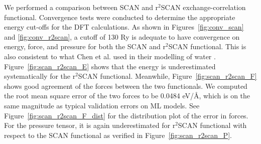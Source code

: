 We performed a comparison between SCAN	and r$^2$SCAN exchange-correlation
functional. Convergence tests were conducted to determine the appropriate
energy cut-offs for the DFT calculations. As shown in
Figures~\ref{fig:conv_scan} and \ref{fig:conv_r2scan}, a  cutoff of 130 Ry  is
adequate to have convergence on  energy, force, and pressure for both the SCAN
and r$^2$SCAN functional. This is also consistent to what Chen et al. used in
their modelling of water \cite{chen2017ab}. Figure~\ref{fig:scan_r2scan_E}
shows that the energy is
underestimated systematically for the r$^2$SCAN functional. Meanwhile,
Figure~\ref{fig:scan_r2scan_F} shows good agreement of the forces between the
two functionals. We computed the root mean square error of the two forces to be
0.0484 \unit{eV/\angstrom}, which is on the same magnitude as typical
validation
errors
on ML models. See Figure~\ref{fig:scan_r2scan_F_dist} for the distribution
plot of the error in forces. For the pressure tensor, it is again
underestimated for r$^2$SCAN functional with respect to the SCAN functional as
verified in  Figure~\ref{fig:scan_r2scan_P}.

